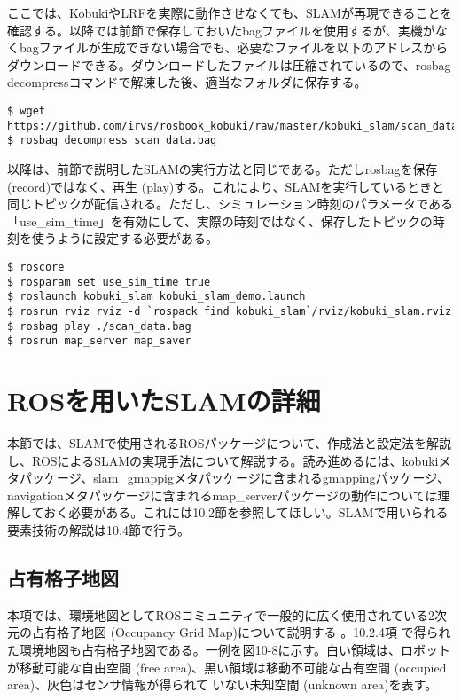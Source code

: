 ここでは、KobukiやLRFを実際に動作させなくても、SLAMが再現できることを確認する。以降では前節で保存しておいたbagファイルを使用するが、実機がなくbagファイルが生成できない場合でも、必要なファイルを以下のアドレスからダウンロードできる。ダウンロードしたファイルは圧縮されているので、rosbag decompressコマンドで解凍した後、適当なフォルダに保存する。

\begin{lstlisting}[language=ROS]
$ wget https://github.com/irvs/rosbook_kobuki/raw/master/kobuki_slam/scan_data.bag
$ rosbag decompress scan_data.bag
\end{lstlisting}

以降は、前節で説明したSLAMの実行方法と同じである。ただしrosbagを保存 (record)ではなく、再生 (play)する。これにより、SLAMを実行しているときと同じトピックが配信される。ただし、シミュレーション時刻のパラメータである「use\_sim\_time」を有効にして、実際の時刻ではなく、保存したトピックの時刻を使うように設定する必要がある。

\begin{lstlisting}[language=ROS]
$ roscore
$ rosparam set use_sim_time true
$ roslaunch kobuki_slam kobuki_slam_demo.launch
$ rosrun rviz rviz -d `rospack find kobuki_slam`/rviz/kobuki_slam.rviz
$ rosbag play ./scan_data.bag
$ rosrun map_server map_saver
\end{lstlisting}

\section{ROSを用いたSLAMの詳細}

本節では、SLAMで使用されるROSパッケージについて、作成法と設定法を解説し、ROSによるSLAMの実現手法について解説する。読み進めるには、kobukiメタパッケージ、slam\_gmappigメタパッケージに含まれるgmappingパッケージ、navigationメタパッケージに含まれるmap\_serverパッケージの動作については理解しておく必要がある。これには10.2節を参照してほしい。SLAMで用いられる要素技術の解説は10.4節で行う。

\subsection{占有格子地図}

本項では、環境地図としてROSコミュニティで一般的に広く使用されている2次元の占有格子地図 (Occupancy Grid Map)について説明する  。10.2.4項  で得られた環境地図も占有格子地図である。一例を図10-8に示す。白い領域は、ロボットが移動可能な自由空間 (free area)、黒い領域は移動不可能な占有空間 (occupied area)、灰色はセンサ情報が得られて  いない未知空間 (unknown area)を表す。

